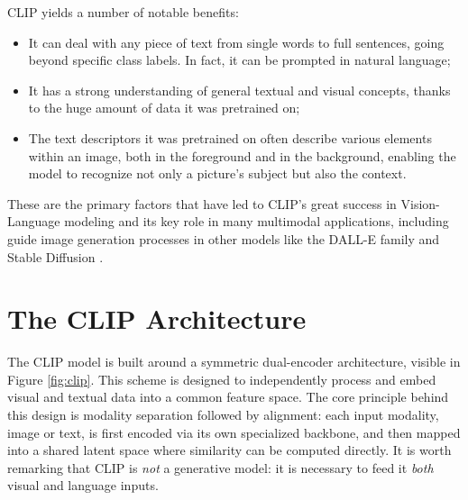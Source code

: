 \documentclass[a4paper, oneside, english]{sapthesis} %
\begin{document}
CLIP yields a number of notable benefits:

\begin{itemize}
    \item It can deal with any piece of text from single words to full sentences, going beyond specific class labels. In fact, it can be prompted in natural language;
    \item It has a strong understanding of general textual and visual concepts, thanks to the huge amount of data it was pretrained on;
    \item The text descriptors it was pretrained on often describe various elements within an image, both in the foreground and in the background, enabling the model to recognize not only a picture's subject but also the context.
\end{itemize}

These are the primary factors that have led to CLIP's great success in Vision-Language modeling and its key role in many multimodal applications, including guide image generation processes in other models like the DALL-E family \cite{ramesh2022hierarchical} and Stable Diffusion \cite{rombach2022high}.


\section{The CLIP Architecture}

The CLIP model is built around a symmetric dual-encoder architecture, visible in Figure \ref{fig:clip}. This scheme is designed to independently process and embed visual and textual data into a common feature space. The core principle behind this design is modality separation followed by alignment: each input modality, image or text, is first encoded via its own specialized backbone, and then mapped into a shared latent space where similarity can be computed directly. It is worth remarking that CLIP is \textit{not} a generative model: it is necessary to feed it \textit{both} visual and language inputs.
\end{document}
